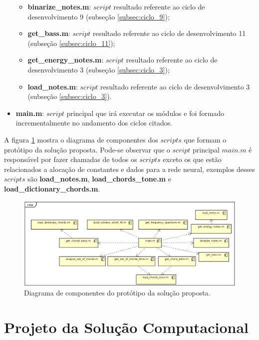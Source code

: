 \begin{itemize}
\begin{itemize}
			\item \textbf{binarize\_notes.m}: $script$ resultado referente ao ciclo de desenvolvimento 9 (subseção \ref{subsec:ciclo_9});
			\item \textbf{get\_bass.m}: $script$ resultado referente ao ciclo de desenvolvimento 11 (subseção \ref{subsec:ciclo_11});
			\item \textbf{get\_energy\_notes.m}: $script$ resultado referente ao ciclo de desenvolvimento 3 (subseção \ref{subsec:ciclo_3});
			\item \textbf{load\_notes.m}: $script$ resultado referente ao ciclo de desenvolvimento 3 (subseção \ref{subsec:ciclo_3}).
		\end{itemize}
	\item \textbf{main.m}: $script$ principal que irá executar os módulos e foi formado incrementalmente no andamento dos ciclos citados.
\end{itemize}

A figura \ref{fig:diagrama_componentes_1} mostra o diagrama de componentes dos $scripts$ que formam o protótipo da solução proposta. Pode-se observar que o $script$ principal $main.m$ é responsável por fazer chamadas de todos os $scripts$ exceto os que estão relacionados a alocação de constantes e dados para a rede neural, exemplos desses $scripts$ são \textbf{load\_notes.m}, \textbf{load\_chords\_tone.m} e \textbf{load\_dictionary\_chords.m}.

\begin{figure}[h] 
  \centering
    \includegraphics[keepaspectratio=true, scale=0.4]{figuras/diagrama_componentes_1}
    \caption{Diagrama de componentes do protótipo da solução proposta.}
    \label{fig:diagrama_componentes_1}
\end{figure}

\section{Projeto da Solução Computacional}

